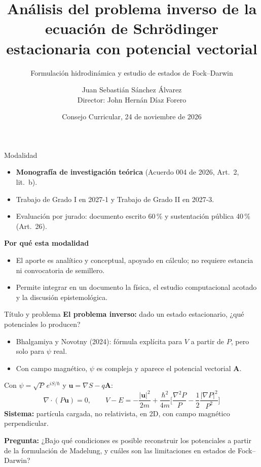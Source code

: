 \documentclass[aspectratio=169,10pt]{beamer}
\title{Análisis del problema inverso de la ecuación de Schrödinger estacionaria con potencial vectorial}
\subtitle{Formulación hidrodinámica y estudio de estados de Fock--Darwin}
\author{Juan Sebastián Sánchez Álvarez\\[2pt] \small Director: John Hernán Díaz Forero}
\institute{Programa Académico de Física --- Universidad Distrital Francisco José de Caldas}
\date{Consejo Curricular, 24 de noviembre de 2026}
\newcommand{\uv}{\mathbf{u}}
\newcommand{\Av}{\mathbf{A}}
\newcommand{\grad}{\nabla}
\begin{document}
\begin{frame}
  \titlepage
\end{frame}

\begin{frame}{Modalidad}
  \begin{itemize}
    \item \textbf{Monografía de investigación teórica} (Acuerdo 004 de 2026, Art.~2, lit.~b).
    \item Trabajo de Grado I en 2027-1 y Trabajo de Grado II en 2027-3.
    \item Evaluación por jurado: documento escrito 60\,\% y sustentación pública 40\,\% (Art.~26).
  \end{itemize}
  \vspace{0.6em}
  \textbf{Por qué esta modalidad}
  \begin{itemize}
    \item El aporte es analítico y conceptual, apoyado en cálculo; no requiere estancia ni convocatoria de semillero.
    \item Permite integrar en un documento la física, el estudio computacional acotado y la discusión epistemológica.
  \end{itemize}
\end{frame}

\begin{frame}{Título y problema}
  \textbf{El problema inverso:} dado un estado estacionario, ¿qué potenciales lo producen?
  \begin{itemize}
    \item Bhalgamiya y Novotny (2024): fórmula explícita para $V$ a partir de $P$, pero solo para $\psi$ real.
    \item Con campo magnético, $\psi$ es compleja y aparece el potencial vectorial $\Av$.
  \end{itemize}
  \vspace{0.4em}
  Con $\psi=\sqrt P\,e^{iS/\hbar}$ y $\uv=\grad S-q\Av$:
  \[
    \grad\cdot(P\uv)=0,\qquad
    V-E=-\frac{|\uv|^2}{2m}+\frac{\hbar^2}{4m}\Big[\frac{\grad^2P}{P}-\frac12\frac{|\grad P|^2}{P^2}\Big]
  \]
  \textbf{Sistema:} partícula cargada, no relativista, en 2D, con campo magnético perpendicular.

  \vspace{0.4em}
  \textbf{Pregunta:} ¿Bajo qué condiciones es posible reconstruir los potenciales a partir de la formulación de Madelung,
  y cuáles son las limitaciones en estados de Fock--Darwin?
\end{frame}
\end{document}
